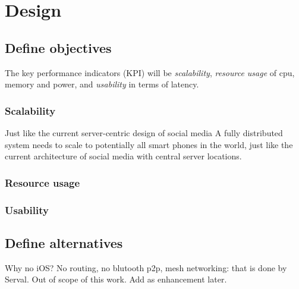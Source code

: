 \chapter{Design}


\section{Define objectives} %




The key performance indicators (KPI) will be \emph{scalability}, \emph{resource usage} of cpu, memory and power, and \emph{usability} in terms of latency.

\subsection{Scalability}
Just like the current server-centric design of social media
A fully distributed system needs to scale to potentially all smart phones in the world, just like the current architecture of social media with central server locations.

\subsection{Resource usage}


\subsection{Usability}



\section{Define alternatives} %



Why no iOS?
No routing, no blutooth p2p, mesh networking: that is done by Serval. Out of scope of this work. Add as enhancement later.

